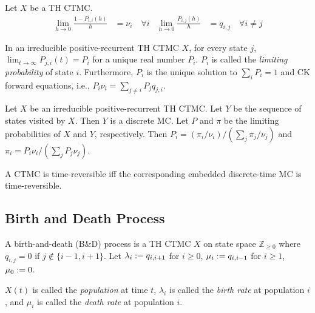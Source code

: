 \documentclass[a4paper, 12pt, fleqn]{article}
\begin{document}
\begin{lemma}
Let $X$ be a TH CTMC.
\begin{align*}
\lim_{h \to 0} \frac{1-P_{i,i}(h)}{h} &= \nu_i\quad\forall i
& \lim_{h \to 0} \frac{P_{i,j}(h)}{h} &= q_{i,j}\quad\forall i \neq j
\end{align*}
\end{lemma}

\begin{lemma}
\label{thm:ctmc:limprob}
In an irreducible positive-recurrent TH CTMC $X$, for every state $j$,
$\lim_{t \to \infty} P_{j,i}(t) = P_i$ for a unique real number $P_i$.
$P_i$ is called the \emph{limiting probability} of state $i$.
Furthermore, $P_i$ is the unique solution to $\sum_i P_i = 1$ and CK forward equations,
i.e., $P_i\nu_i = \sum_{j \neq i} P_jq_{j,i}$.
\end{lemma}

\begin{lemma}
Let $X$ be an irreducible positive-recurrent TH CTMC. Let $Y$ be the sequence of states visited by $X$.
Then $Y$ is a discrete MC. Let $P$ and $\pi$ be the limiting probabilities of $X$ and $Y$, respectively.
Then $P_i = (\pi_i/\nu_i)/(\sum_j \pi_j/\nu_j)$ and $\pi_i = P_i\nu_i/(\sum_j P_j\nu_j)$.
\end{lemma}

\begin{definition}
A CTMC is time-reversible iff the corresponding embedded discrete-time MC is time-reversible.
\end{definition}

\subsection{Birth and Death Process}

\begin{definition}
A birth-and-death (B\&D) process is a TH CTMC $X$ on state space $\mathbb{Z}_{\ge 0}$ where
$q_{i,j} = 0$ if $j \not\in \{i-1, i+1\}$. Let $\lambda_i := q_{i,i+1}$ for $i \ge 0$,
$\mu_i := q_{i,i-1}$ for $i \ge 1$, $\mu_0 := 0$.

$X(t)$ is called the \emph{population} at time $t$,
$\lambda_i$ is called the \emph{birth rate} at population $i$,
and $\mu_i$ is called the \emph{death rate} at population $i$.
\end{definition}
\end{document}
